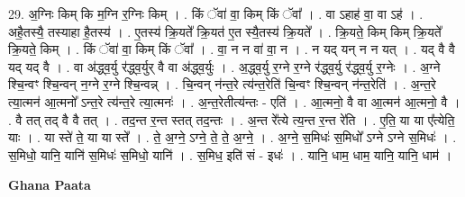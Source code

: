 \documentclass[17pt]{extarticle}
\begin{document}
29. अ॒ग्निः किम् कि म॒ग्नि र॒ग्निः किम् । . किं ॅवा॑ वा॒ किम् किं ॅवा᳚ । . वा ऽहाह॑ वा॒ वा ऽह॑ । . अहै॒तस्यै॒ तस्याहा है॒तस्य॑ । . ए॒तस्य॑ क्रि॒यते᳚ क्रि॒यत॑ ए॒त स्यै॒तस्य॑ क्रि॒यते᳚ । . क्रि॒यते॒ किम् किम् क्रि॒यते᳚ क्रि॒यते॒ किम् । . किं ॅवा॑ वा॒ किम् किं ॅवा᳚ । . वा॒ न न वा॑ वा॒ न । . न यद् यन् न न यत् । . यद् वै वै यद् यद् वै । . वा अ॑द्ध्व॒र्यु र॑द्ध्व॒र्युर् वै वा अ॑द्ध्व॒र्युः । . अ॒द्ध्व॒र्यु र॒ग्ने र॒ग्ने र॑द्ध्व॒र्यु र॑द्ध्व॒र्यु र॒ग्नेः । . अ॒ग्ने श्चि॒न्वꣳ श्चि॒न्वन् न॒ग्ने र॒ग्ने श्चि॒न्वन्न् । . चि॒न्वन् न॑न्त॒रे त्य॑न्त॒रेति॑ चि॒न्वꣳ श्चि॒न्वन् न॑न्त॒रेति॑ । . अ॒न्त॒रे त्या॒त्मन॑ आ॒त्मनो᳚ ऽन्त॒रे त्य॑न्त॒रे त्या॒त्मनः॑ । . अ॒न्त॒रेतीत्य॑न्तः - एति॑ । . आ॒त्मनो॒ वै वा आ॒त्मन॑ आ॒त्मनो॒ वै । . वै तत् तद् वै वै तत् । . तद॒न्त र॒न्त स्तत् तद॒न्तः । . अ॒न्त रे᳚त्ये त्य॒न्त र॒न्त रे॑ति । . ए॒ति॒ या या ए᳚त्येति॒ याः । . या स्ते॑ ते॒ या या स्ते᳚ । . ते॒ अ॒ग्ने॒ ऽग्ने॒ ते॒ ते॒ अ॒ग्ने॒ । . अ॒ग्ने॒ स॒मिधः॑ स॒मिधो᳚ ऽग्ने ऽग्ने स॒मिधः॑ । . स॒मिधो॒ यानि॒ यानि॑ स॒मिधः॑ स॒मिधो॒ यानि॑ । . स॒मिध॒ इति॑ सं - इधः॑ । . यानि॒ धाम॒ धाम॒ यानि॒ यानि॒ धाम॑ । \newline

\textbf{Ghana Paata } \newline
\end{document}
